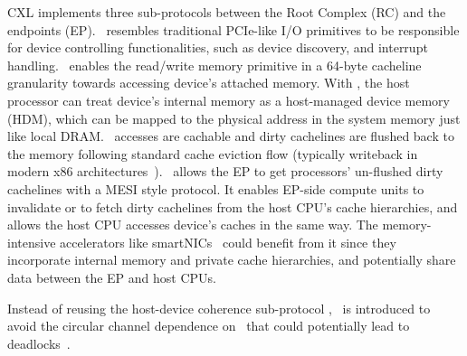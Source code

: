 \ifx\undefined\stale
CXL implements three sub-protocols between the Root Complex (RC) and the endpoints (EP). 
\cxlio~resembles traditional PCIe-like I/O primitives to be responsible for device controlling functionalities, such as device discovery, and interrupt handling. 
\cxlmem~enables the read/write memory primitive in a 64-byte cacheline granularity towards accessing device's attached memory. With \cxlmem, the host processor can treat device's internal memory as a host-managed device memory (HDM), which can be mapped to the physical address in the system memory just like local DRAM. 
\cxlmem~accesses are cachable and dirty cachelines are flushed back to the memory following standard cache eviction flow (typically writeback in modern x86 architectures~\cite{intel-doc, spandex_asplos18, book_cc}). 
\cxlcache~allows the EP to get processors' un-flushed dirty cachelines with a MESI style protocol. It enables EP-side compute units to invalidate or to fetch dirty cachelines from the host CPU's cache hierarchies, and allows the host CPU accesses device's caches in the same way. 
The memory-intensive accelerators like smartNICs~\cite{ccnic_asplos24} could benefit from it since they incorporate internal memory and private cache hierarchies, and potentially share data between the EP and host CPUs. 
\fi



\ifx\undefined\stale
Instead of reusing the host-device coherence sub-protocol \cxlcache, \cxlbi~is introduced to avoid the circular channel dependence on \cxlmem~that could potentially lead to deadlocks~\cite{cxl-shortdoc, cxl-doc, cxl-paper}. 
\fi



